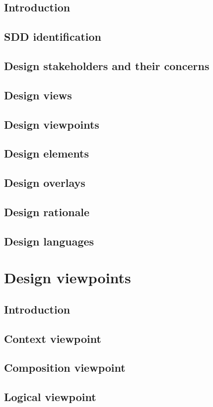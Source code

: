 \documentclass[compsoc,draftclsnofoot,onecolumn,10pt]{IEEEtran}
\begin{document}
\subsection{Introduction}
\subsection{SDD identification}
\subsection{Design stakeholders and their concerns} 
\subsection{Design views}
\subsection{Design viewpoints} 
\subsection{Design elements} 
\subsection{Design overlays}
\subsection{Design rationale}
\subsection{Design languages}

\section{Design viewpoints}
\subsection{Introduction} 
\subsection{Context viewpoint} 
\subsection{Composition viewpoint} 
\subsection{Logical viewpoint} 
\end{document}
